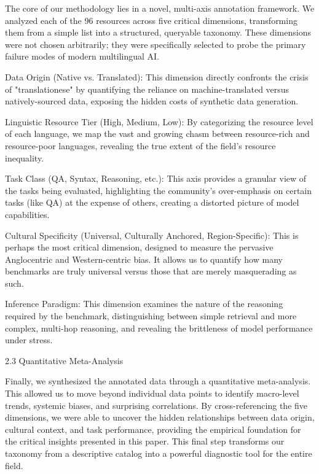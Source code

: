 \documentclass[acmsmall]{acmart}
\begin{document}
The core of our methodology lies in a novel, multi-axis annotation framework. We analyzed each of the 96 resources across five critical dimensions, transforming them from a simple list into a structured, queryable taxonomy. These dimensions were not chosen arbitrarily; they were specifically selected to probe the primary failure modes of modern multilingual AI.
\begin{paralist}

\item Data Origin (Native vs. Translated): This dimension directly confronts the crisis of "translationese" by quantifying the reliance on machine-translated versus natively-sourced data, exposing the hidden costs of synthetic data generation.

\item Linguistic Resource Tier (High, Medium, Low): By categorizing the resource level of each language, we map the vast and growing chasm between resource-rich and resource-poor languages, revealing the true extent of the field's resource inequality.

\item Task Class (QA, Syntax, Reasoning, etc.): This axis provides a granular view of the tasks being evaluated, highlighting the community's over-emphasis on certain tasks (like QA) at the expense of others, creating a distorted picture of model capabilities.

\item Cultural Specificity (Universal, Culturally Anchored, Region-Specific): This is perhaps the most critical dimension, designed to measure the pervasive Anglocentric and Western-centric bias. It allows us to quantify how many benchmarks are truly universal versus those that are merely masquerading as such.

\item Inference Paradigm: This dimension examines the nature of the reasoning required by the benchmark, distinguishing between simple retrieval and more complex, multi-hop reasoning, and revealing the brittleness of model performance under stress.

\end{paralist}

2.3 Quantitative Meta-Analysis

Finally, we synthesized the annotated data through a quantitative meta-analysis. This allowed us to move beyond individual data points to identify macro-level trends, systemic biases, and surprising correlations. By cross-referencing the five dimensions, we were able to uncover the hidden relationships between data origin, cultural context, and task performance, providing the empirical foundation for the critical insights presented in this paper. This final step transforms our taxonomy from a descriptive catalog into a powerful diagnostic tool for the entire field.
\end{document}
